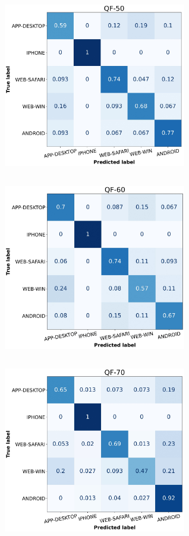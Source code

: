 \begingroup
    \centering
    \includegraphics[width=8cm, height=8cm, keepaspectratio]{Immagini/Classificazione/confusion_matrix_RF_QF-50.jpg}\ \ \ \ \
    \includegraphics[width=8cm, height=8cm, keepaspectratio]{Immagini/Classificazione/confusion_matrix_RF_QF-60.jpg}\\\vspace{1em}
    \includegraphics[width=8cm, height=8cm, keepaspectratio]{Immagini/Classificazione/confusion_matrix_RF_QF-70.jpg}\ \ \ \ \
